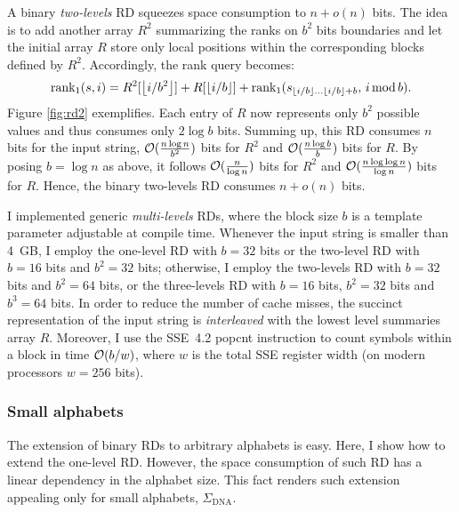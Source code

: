 A binary \emph{two-levels} RD squeezes space consumption to $n+o(n)$ bits.
The idea is to add another array $R^2$ summarizing the ranks on $b^2$ bits boundaries and let the initial array $R$ store only local positions within the corresponding blocks defined by $R^2$.
Accordingly, the rank query becomes:
\begin{eqnarray}
\rank_1(s,i) = R^2[\xfloor{i/b^2}] + R[\xfloor{i/b}] + \rank_1(s_{\xfloor{i/b} \dots \xfloor{i/b}+b}, \, i \imod{b}).
\end{eqnarray}
Figure \ref{fig:rd2} exemplifies.
Each entry of $R$ now represents only $b^2$ possible values and thus consumes only $2\log{b}$ bits.
Summing up, this RD consumes $n$ bits for the input string, $\mathcal{O}(\frac{n \log{n}}{b^2})$ bits for $R^2$ and $\mathcal{O}(\frac{n \log{b}}{b})$ bits for $R$.
By posing $b=\log{n}$ as above, it follows $\mathcal{O}(\frac{n}{\log{n}})$ bits for $R^2$ and $\mathcal{O}(\frac{n \log{\log{n}}}{\log{n}})$ bits for $R$.
Hence, the binary two-levels RD consumes $n + o(n)$ bits.

I implemented generic \emph{multi-levels} RDs, where the block size $b$ is a template parameter adjustable at compile time.
Whenever the input string is smaller than 4~GB, I employ the one-level RD with $b = 32$ bits or the two-level RD with $b = 16$ bits and $b^2 = 32$ bits;
otherwise, I employ the two-levels RD with $b = 32$ bits and $b^2 = 64$ bits, or the three-levels RD with $b = 16$ bits, $b^2 = 32$ bits and $b^3 = 64$ bits.
In order to reduce the number of cache misses, the succinct representation of the input string is \emph{interleaved} with the lowest level summaries array $R$.
Moreover, I use the SSE~4.2 popcnt instruction \citep{Intel2011} to count symbols within a block in time $\mathcal{O}(b/w)$, where $w$ is the total SSE register width (on modern processors $w=256$ bits).

\subsubsection{Small alphabets}

The extension of binary RDs to arbitrary alphabets is easy.
Here, I show how to extend the one-level RD.
However, the space consumption of such RD has a linear dependency in the alphabet size.
This fact renders such extension appealing only for small alphabets, \eg $\Sigma_{\text{DNA}}$.

